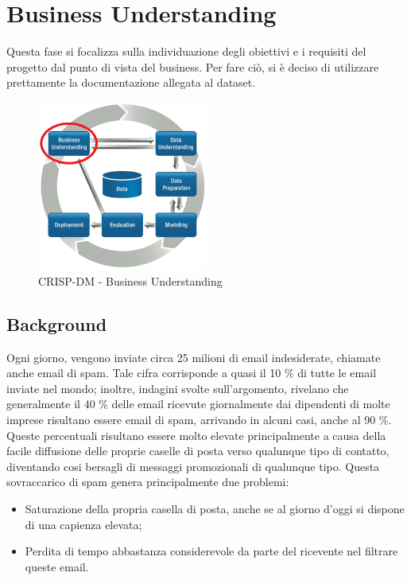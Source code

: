 \chapter{Business Understanding}
Questa fase si focalizza sulla individuazione degli obiettivi e i requisiti del progetto dal punto di vista del business. Per fare ciò, si è deciso di utilizzare prettamente la documentazione allegata al dataset.

\begin{figure}[hbtp]
	\centering
	\includegraphics[width=0.5\textwidth]{./images/CRISPDM_1.png}
	\caption{CRISP-DM - Business Understanding}
	\label{CRISPDM_1}
\end{figure}

\section{Background}\label{Background}
Ogni giorno, vengono inviate circa 25 milioni di email indesiderate, chiamate anche email di spam. Tale cifra corrisponde a quasi il 10 \% di tutte le email inviate nel mondo; inoltre, indagini svolte sull'argomento, rivelano che generalmente il 40 \% delle email ricevute giornalmente dai dipendenti di molte imprese risultano essere email di spam, arrivando in alcuni casi, anche al 90 \%.
Queste percentuali risultano essere molto elevate principalmente a causa della facile diffusione delle proprie caselle di posta verso qualunque tipo di contatto, diventando cosi bersagli di messaggi promozionali di qualunque tipo. Questa sovraccarico di spam genera principalmente due problemi:
\begin{itemize}
\item Saturazione della propria casella di posta, anche se al giorno d'oggi si dispone di una capienza elevata;
\item Perdita di tempo abbastanza considerevole da parte del ricevente nel filtrare queste email.
\end{itemize}

